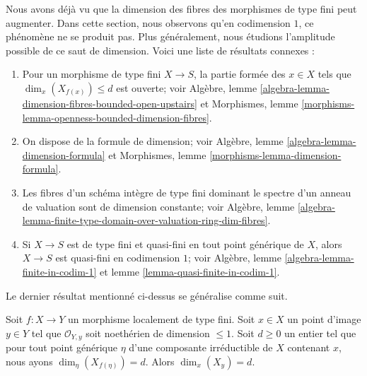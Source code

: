 \noindent
Nous avons déjà vu que la dimension des fibres des morphismes de type fini peut
augmenter. Dans cette section, nous observons qu'en codimension $1$,
ce phénomène ne se produit pas. Plus généralement, nous étudions l'amplitude
possible de ce saut de dimension. Voici une liste de résultats connexes :
\begin{enumerate}
\item Pour un morphisme de type fini $X \to S$, la partie formée des
$x \in X$ tels que $\dim_x(X_{f(x)}) \leq d$ est ouverte; voir
Algèbre, lemme \ref{algebra-lemma-dimension-fibres-bounded-open-upstairs}
et
Morphismes, lemme \ref{morphisms-lemma-openness-bounded-dimension-fibres}.
\item On dispose de la formule de dimension; voir
Algèbre, lemme \ref{algebra-lemma-dimension-formula} et
Morphismes, lemme \ref{morphisms-lemma-dimension-formula}.
\item Les fibres d'un schéma intègre de type fini dominant
le spectre d'un anneau de valuation sont de dimension constante; voir Algèbre, lemme
\ref{algebra-lemma-finite-type-domain-over-valuation-ring-dim-fibres}.
\item Si $X \to S$ est de type fini et quasi-fini en tout
point générique de $X$, alors $X \to S$ est quasi-fini en codimension $1$; voir
Algèbre, lemme \ref{algebra-lemma-finite-in-codim-1} et
lemme \ref{lemma-quasi-finite-in-codim-1}.
\end{enumerate}
Le dernier résultat mentionné ci-dessus se généralise comme suit.

\begin{lemma}
\label{lemma-dimension-fibre-in-codim-1}
Soit $f : X \to Y$ un morphisme localement de type fini. Soit $x \in
X$ un point d'image $y \in Y$ tel que $\mathcal{O}_{Y, y}$ soit
noethérien de dimension $\leq 1$. Soit $d \geq 0$ un entier tel
que pour tout point générique $\eta$ d'une composante irréductible de $X$
contenant $x$, nous ayons $\dim_\eta(X_{f(\eta)}) = d$. Alors $\dim_x(X_y) = d$.
\end{lemma}


